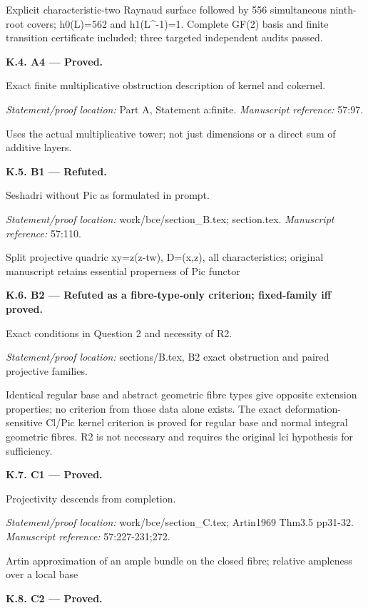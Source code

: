 \par Explicit characteristic-two Raynaud surface followed by 556 simultaneous ninth-root covers; h0(L)=562 and h1(L\textasciicircum{}-1)=1. Complete GF(2) basis and finite transition certificate included; three targeted independent audits passed.
\par\medskip\noindent\textbf{K.4. A4 --- Proved.}\par
Exact finite multiplicative obstruction description of kernel and cokernel.
\par\emph{Statement/proof location:} Part A, Statement a:finite.
\emph{Manuscript reference:} 57:97.
\par Uses the actual multiplicative tower; not just dimensions or a direct sum of additive layers.
\par\medskip\noindent\textbf{K.5. B1 --- Refuted.}\par
Seshadri without Pic as formulated in prompt.
\par\emph{Statement/proof location:} work/bce/section\_B.tex; section.tex.
\emph{Manuscript reference:} 57:110.
\par Split projective quadric xy=z(z-tw), D=(x,z), all characteristics; original manuscript retains essential properness of Pic functor
\par\medskip\noindent\textbf{K.6. B2 --- Refuted as a fibre-type-only criterion; fixed-family iff proved.}\par
Exact conditions in Question 2 and necessity of R2.
\par\emph{Statement/proof location:} sections/B.tex, B2 exact obstruction and paired projective families.
\par Identical regular base and abstract geometric fibre types give opposite extension properties; no criterion from those data alone exists. The exact deformation-sensitive Cl/Pic kernel criterion is proved for regular base and normal integral geometric fibres. R2 is not necessary and requires the original lci hypothesis for sufficiency.
\par\medskip\noindent\textbf{K.7. C1 --- Proved.}\par
Projectivity descends from completion.
\par\emph{Statement/proof location:} work/bce/section\_C.tex; Artin1969 Thm3.5 pp31-32.
\emph{Manuscript reference:} 57:227-231;272.
\par Artin approximation of an ample bundle on the closed fibre; relative ampleness over a local base
\par\medskip\noindent\textbf{K.8. C2 --- Proved.}\par
